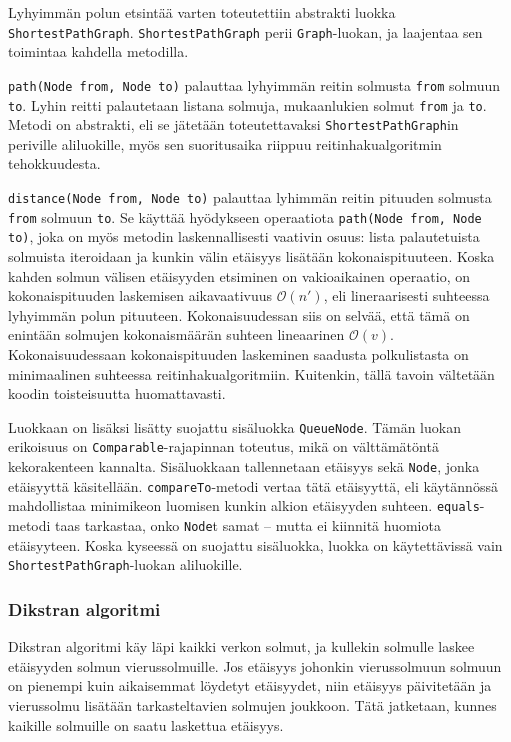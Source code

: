 \documentclass[10pt,a4paper]{article}
\begin{document}
Lyhyimmän polun etsintää varten toteutettiin abstrakti luokka \texttt{ShortestPathGraph}. \texttt{ShortestPathGraph} perii \texttt{Graph}-luokan, ja laajentaa sen toimintaa kahdella metodilla.

\texttt{path(Node from, Node to)} palauttaa lyhyimmän reitin solmusta \texttt{from} solmuun \texttt{to}. Lyhin reitti palautetaan listana solmuja, mukaanlukien solmut \texttt{from} ja \texttt{to}. Metodi on abstrakti, eli se jätetään toteutettavaksi \texttt{ShortestPathGraph}in  periville aliluokille, myös sen suoritusaika riippuu reitinhakualgoritmin tehokkuudesta.

\texttt{distance(Node from, Node to)} palauttaa lyhimmän reitin pituuden solmusta \texttt{from} solmuun \texttt{to}. Se käyttää hyödykseen operaatiota \texttt{path(Node from, Node to)}, joka on myös metodin laskennallisesti vaativin osuus: lista palautetuista solmuista iteroidaan ja kunkin välin etäisyys lisätään kokonaispituuteen. Koska kahden solmun välisen etäisyyden etsiminen on vakioaikainen operaatio, on kokonaispituuden laskemisen aikavaativuus $\mathcal{O}(n')$, eli lineraarisesti suhteessa lyhyimmän polun pituuteen. Kokonaisuudessan siis on selvää, että tämä on enintään solmujen kokonaismäärän suhteen lineaarinen $\mathcal{O}(v)$. Kokonaisuudessaan kokonaispituuden laskeminen saadusta polkulistasta on minimaalinen suhteessa reitinhakualgoritmiin. Kuitenkin, tällä tavoin vältetään koodin toisteisuutta huomattavasti.

Luokkaan on lisäksi lisätty suojattu sisäluokka \texttt{QueueNode}. Tämän luokan erikoisuus on \texttt{Comparable}-rajapinnan toteutus, mikä on välttämätöntä kekorakenteen kannalta. Sisäluokkaan tallennetaan etäisyys sekä \texttt{Node}, jonka etäisyyttä käsitellään. \texttt{compareTo}-metodi vertaa tätä etäisyyttä, eli käytännössä mahdollistaa minimikeon luomisen kunkin alkion etäisyyden suhteen. \texttt{equals}-metodi taas tarkastaa, onko \texttt{Node}t samat -- mutta ei kiinnitä huomiota etäisyyteen. Koska kyseessä on suojattu sisäluokka, luokka on käytettävissä vain \texttt{ShortestPathGraph}-luokan aliluokille.

\subsubsection{Dikstran algoritmi}

Dikstran algoritmi käy läpi kaikki verkon solmut, ja kullekin solmulle laskee etäisyyden solmun vierussolmuille. Jos etäisyys johonkin vierussolmuun solmuun on pienempi kuin aikaisemmat löydetyt etäisyydet, niin etäisyys päivitetään ja vierussolmu lisätään tarkasteltavien solmujen joukkoon. Tätä jatketaan, kunnes kaikille solmuille on saatu laskettua etäisyys.
\end{document}
